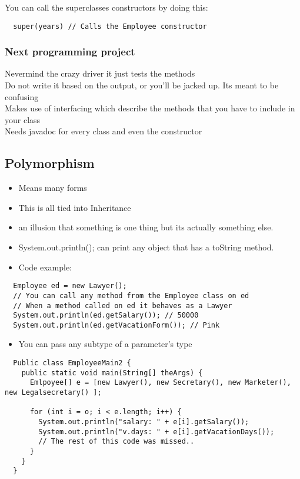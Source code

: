 \documentclass{article}
\begin{document}
You can call the superclasses constructors by doing this:

\begin{lstlisting}
  super(years) // Calls the Employee constructor 
\end{lstlisting}

\subsubsection{Next programming project}
Nevermind the crazy driver it just tests the methods\\
Do not write it based on the output, or you'll be jacked up. Its meant to be confusing\\
Makes use of interfacing which describe the methods that you have to include in your class\\
Needs javadoc for every class and even the constructor 

\subsection{Polymorphism}

\begin{itemize}
  \item Means many forms 
  \item This is all tied into Inheritance 
  \item an illusion that something is one thing but its actually something else.
  \item System.out.println(); can print any object that has a toString method.
  \item Code example:
\end{itemize}

\begin{lstlisting}
  Employee ed = new Lawyer();
  // You can call any method from the Employee class on ed
  // When a method called on ed it behaves as a Lawyer
  System.out.println(ed.getSalary()); // 50000
  System.out.println(ed.getVacationForm()); // Pink
\end{lstlisting}
\pagebreak
\begin{itemize}
  \item You can pass any subtype of a parameter's type 
\end{itemize}

\begin{lstlisting}
  Public class EmployeeMain2 {
    public static void main(String[] theArgs) {
      Emlpoyee[] e = [new Lawyer(), new Secretary(), new Marketer(), new Legalsecretary() ];

      for (int i = o; i < e.length; i++) {
        System.out.println("salary: " + e[i].getSalary());
        System.out.println("v.days: " + e[i].getVacationDays());
        // The rest of this code was missed.. 
      }
    }
  }
\end{lstlisting}
\end{document}

